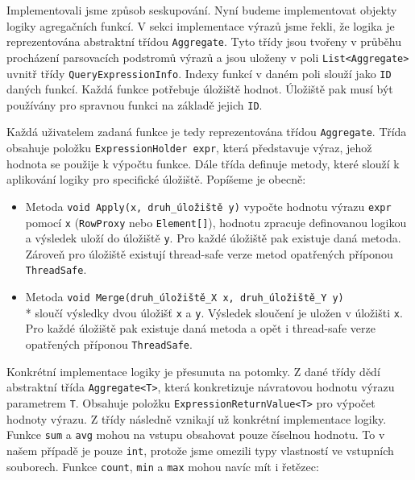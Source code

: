 Implementovali jsme způsob seskupování.
Nyní budeme implementovat objekty logiky agregačních funkcí.
V sekci implementace výrazů jsme řekli, že logika je reprezentována abstraktní třídou \texttt{Aggregate}.
Tyto třídy jsou tvořeny v průběhu procházení parsovacích podstromů výrazů a jsou uloženy v poli \texttt{List<Aggregate>} uvnitř třídy \texttt{QueryExpressionInfo}.
Indexy funkcí v daném poli slouží jako \texttt{ID} daných funkcí.
Každá funkce potřebuje úložiště hodnot.
Úložiště pak musí být používány pro spravnou funkci na základě jejich \texttt{ID}.

Každá uživatelem zadaná funkce je tedy reprezentována třídou \texttt{Aggregate}.
Třída obsahuje položku \texttt{ExpressionHolder expr}, která představuje výraz, jehož hodnota se použije k výpočtu funkce.
Dále třída definuje metody, které slouží k aplikování logiky pro specifické úložiště.
Popíšeme je obecně:
\begin{itemize}
\item Metoda \texttt{void Apply(x, druh\_úložiště y)} vypočte hodnotu výrazu \texttt{expr} pomocí \texttt{x} (\texttt{RowProxy} nebo \texttt{Element[]}), hodnotu zpracuje definovanou logikou a výsledek uloží do úložiště \texttt{y}.
Pro každé úložiště pak existuje daná metoda.
Zároveň pro úložiště existují thread-safe verze metod opatřených příponou \texttt{ThreadSafe}.

\item Metoda \texttt{void Merge(druh\_úložiště\_X x, druh\_úložiště\_Y y)}\\* sloučí výsledky dvou úložišť \texttt{x} a \texttt{y}. 
Výsledek sloučení je uložen v úložišti \texttt{x}.
Pro každé úložiště pak existuje daná metoda a opět i thread-safe verze opatřených příponou \texttt{ThreadSafe}.
\end{itemize}
Konkrétní implementace logiky je přesunuta na potomky.
Z dané třídy dědí abstraktní třída \texttt{Aggregate<T>}, která konkretizuje návratovou hodnotu výrazu parametrem \texttt{T}.
Obsahuje položku \texttt{ExpressionReturnValue<T>} pro výpočet hodnoty výrazu.
Z třídy následně vznikají už konkrétní implementace logiky.
Funkce \texttt{sum} a \texttt{avg} mohou na vstupu obsahovat pouze číselnou hodnotu.
To v našem případě je pouze \texttt{int}, protože jsme omezili typy vlastností ve vstupních souborech.
Funkce \texttt{count}, \texttt{min} a \texttt{max} mohou navíc mít i řetězec:
